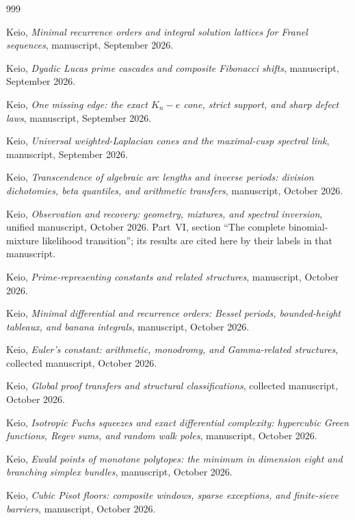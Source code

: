\documentclass[11pt]{amsart}
\theoremstyle{definition}
\theoremstyle{remark}
\begin{document}
\begin{thebibliography}{999}

 Keio, \emph{Minimal recurrence orders and integral solution lattices for Franel sequences}, manuscript, September 2026.

 Keio, \emph{Dyadic Lucas prime cascades and composite Fibonacci shifts}, manuscript, September 2026.

 Keio, \emph{One missing edge: the exact $K_n-e$ cone, strict support, and sharp defect laws}, manuscript, September 2026.

 Keio, \emph{Universal weighted-Laplacian cones and the maximal-cusp spectral link}, manuscript, September 2026.

 Keio, \emph{Transcendence of algebraic arc lengths and inverse periods: division dichotomies, beta quantiles, and arithmetic transfers}, manuscript, October 2026.

 Keio, \emph{Observation and recovery: geometry, mixtures, and spectral inversion}, unified manuscript, October 2026. Part~VI, section ``The complete binomial-mixture likelihood transition''; its results are cited here by their labels in that manuscript.

 Keio, \emph{Prime-representing constants and related structures}, manuscript, October 2026.

 Keio, \emph{Minimal differential and recurrence orders: Bessel periods, bounded-height tableaux, and banana integrals}, manuscript, October 2026.

 Keio, \emph{Euler's constant: arithmetic, monodromy, and Gamma-related structures}, collected manuscript, October 2026.

 Keio, \emph{Global proof transfers and structural classifications}, collected manuscript, October 2026.

 Keio, \emph{Isotropic Fuchs squeezes and exact differential complexity: hypercubic Green functions, Regev sums, and random walk poles}, manuscript, October 2026.

 Keio, \emph{Ewald points of monotone polytopes: the minimum in dimension eight and branching simplex bundles}, manuscript, October 2026.

 Keio, \emph{Cubic Pisot floors: composite windows, sparse exceptions, and finite-sieve barriers}, manuscript, October 2026.


\end{thebibliography}
\end{document}
